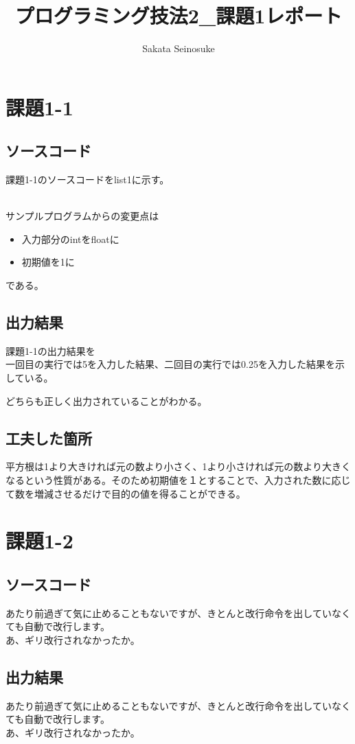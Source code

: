 \documentclass{ltjsarticle}
\begin{document}
\title{プログラミング技法2_課題1レポート}
\author{Sakata Seinosuke}
\maketitle

\section*{課題1-1}
\subsection*{ソースコード}
課題1-1のソースコードをlist1に示す。

\\サンプルプログラムからの変更点は
\begin{itemize}
    \item 入力部分のintをfloatに
    \item 初期値を1に
\end{itemize}
である。

\subsection*{出力結果}
課題1-1の出力結果を
\\一回目の実行では5を入力した結果、二回目の実行では0.25を入力した結果を示している。

どちらも正しく出力されていることがわかる。

\subsection*{工夫した箇所}
平方根は1より大きければ元の数より小さく、1より小さければ元の数より大きくなるという性質がある。そのため初期値を１とすることで、入力された数に応じて数を増減させるだけで目的の値を得ることができる。

\section*{課題1-2}
\subsection*{ソースコード}
あたり前過ぎて気に止めることもないですが、きとんと改行命令を出していなくても自動で改行します。
\\あ、ギリ改行されなかったか。

\subsection*{出力結果}
あたり前過ぎて気に止めることもないですが、きとんと改行命令を出していなくても自動で改行します。
\\あ、ギリ改行されなかったか。
\end{document}

